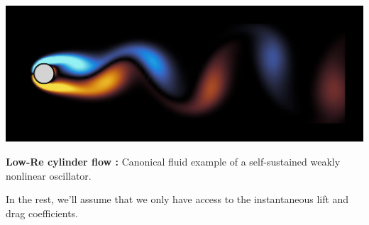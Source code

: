 \documentclass[aspectratio=169, usenames, dvipsnames]{beamer}
\begin{document}

\begin{frame}
  \vfill
  \begin{minipage}{.28\textwidth}
    \centering
    \includegraphics[height=.4\textheight, angle=-90, origin=c]{von_karman}
  \end{minipage}%
  \hfill
  \begin{minipage}{.68\textwidth}
    \textbf{Low-Re cylinder flow :} Canonical fluid example of a self-sustained weakly nonlinear oscillator.

    \bigskip

    In the rest, we'll assume that we only have access to the instantaneous lift and drag coefficients.
  \end{minipage}
  \vfill
\end{frame}
\end{document}
